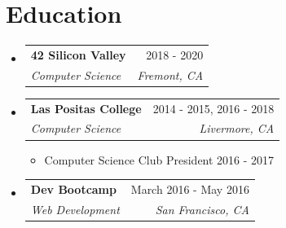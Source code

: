 \documentclass[letterpaper,10pt]{article}
\makeatletter
\newcommand{\afterListSpace}{-2pt}
\newcommand{\afterHeadingSpace}{-5pt}
\newcommand{\betweenItemsSpace}{-8pt}
\newcommand{\nestedListTopSpace}{3pt}
\newcommand{\resumeItem}[1]{
  \item{
    {#1 \vspace{-1pt}}
  }
}
\newcommand{\resumeSubheading}[4]{
  \vspace{-1pt}\item
    \begin{tabular*}{\textwidth}[t]{@{}l@{\extracolsep{\fill}}r@{}}
      \textbf{#1} & #2 \\
      \textit{\small#3} & \textit{\small #4} \\
    \end{tabular*}\vspace{\afterHeadingSpace}
}
\newcommand{\resumeSubHeadingListStart}{\begin{itemize}[leftmargin=0.15in, label={}, itemsep=\betweenItemsSpace]}
\newcommand{\resumeSubHeadingListEnd}{\end{itemize}\vspace{\afterListSpace}}
\newcommand{\resumeItemListStart}{\begin{itemize}[leftmargin=0.2in, itemsep=0pt, topsep=\nestedListTopSpace]}
\newcommand{\resumeItemListEnd}{\end{itemize}\vspace{\afterListSpace}}
\makeatother
\begin{document}
\section{Education}
  \resumeSubHeadingListStart
    \resumeSubheading
      {42 Silicon Valley}{2018 - 2020}
      {Computer Science}{Fremont, CA}
    \resumeSubheading
      {Las Positas College}{2014 - 2015, 2016 - 2018}
      {Computer Science}{Livermore, CA}
      \resumeItemListStart
        \resumeItem{Computer Science Club President 2016 - 2017}
      \resumeItemListEnd
    \resumeSubheading
      {Dev Bootcamp}{March 2016 - May 2016}
      {Web Development}{San Francisco, CA}
  \resumeSubHeadingListEnd

\end{document}
